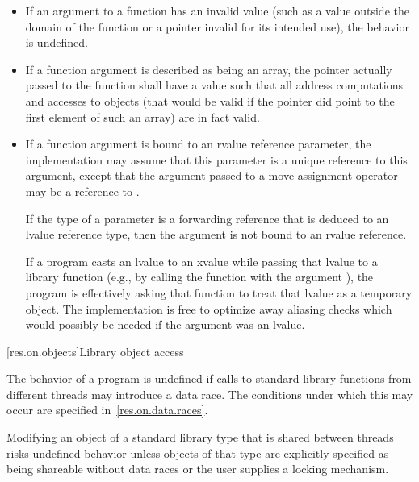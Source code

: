 \begin{itemize}
\item
If an argument to a function has an invalid value (such
%
as a value outside the domain of the function or a pointer invalid for its
intended use), the behavior is undefined.
%

\item
If a function argument is described as being an array,
%
the pointer actually passed to the function shall have a value such that all
address computations and accesses to objects (that would be valid if the
pointer did point to the first element of such an array) are in fact valid.

\item
If a function argument is bound to an rvalue reference parameter, the implementation may
assume that this parameter is a unique reference to this argument,
except that the argument passed to a move-assignment operator may be
a reference to .
\begin{note}
If the type of a parameter is a forwarding reference
that is deduced to an lvalue reference type, then
the argument is not bound to an rvalue reference.
\end{note}
\begin{note}
If a program casts
an lvalue to an xvalue while passing that lvalue to a library function
(e.g., by calling the function with the argument ), the program
is effectively asking that function to treat that lvalue as a temporary object.
The implementation
is free to optimize away aliasing checks which would possibly be needed if the argument was
an lvalue.
\end{note}
\end{itemize}

[res.on.objects]{Library object access}

\pnum
The behavior of a program is undefined if calls to standard library functions from different
threads may introduce a data race. The conditions under which this may occur are specified
in~\ref{res.on.data.races}.
\begin{note}
Modifying an object of a standard library type that is
shared between threads risks undefined behavior unless objects of that type are explicitly
specified as being shareable without data races or the user supplies a locking mechanism.
\end{note}


